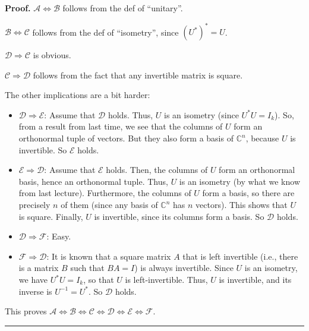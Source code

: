 \documentclass[numbers=enddot,12pt,final,onecolumn,notitlepage]{scrartcl}%
\numberwithin{exer}{subsection}
\theoremstyle{definition}
\newenvironment{proof}[1][Proof]{\noindent\textbf{#1.} }{\ \rule{0.5em}{0.5em}}
\begin{document}
\begin{proof}
$\mathcal{A}\Longleftrightarrow\mathcal{B}$ follows from the def of
\textquotedblleft unitary\textquotedblright.

$\mathcal{B}\Longleftrightarrow\mathcal{C}$ follows from the def of
\textquotedblleft isometry\textquotedblright, since $\left(  U^{\ast}\right)
^{\ast}=U$.

$\mathcal{D}\Longrightarrow\mathcal{C}$ is obvious.

$\mathcal{C}\Longrightarrow\mathcal{D}$ follows from the fact that any
invertible matrix is square.

The other implications are a bit harder:

\begin{itemize}
\item $\mathcal{D}\Longrightarrow\mathcal{E}$: Assume that $\mathcal{D}$
holds. Thus, $U$ is an isometry (since $U^{\ast}U=I_{k}$). So, from a result
from last time, we see that the columns of $U$ form an orthonormal tuple of
vectors. But they also form a basis of $\mathbb{C}^{n}$, because $U$ is
invertible. So $\mathcal{E}$ holds.

\item $\mathcal{E}\Longrightarrow\mathcal{D}$: Assume that $\mathcal{E}$
holds. Then, the columns of $U$ form an orthonormal basis, hence an
orthonormal tuple. Thus, $U$ is an isometry (by what we know from last
lecture). Furthermore, the columns of $U$ form a basis, so there are precisely
$n$ of them (since any basis of $\mathbb{C}^{n}$ has $n$ vectors). This shows
that $U$ is square. Finally, $U$ is invertible, since its columns form a
basis. So $\mathcal{D}$ holds.

\item $\mathcal{D}\Longrightarrow\mathcal{F}$: Easy.

\item $\mathcal{F}\Longrightarrow\mathcal{D}$: It is known that a square
matrix $A$ that is left invertible (i.e., there is a matrix $B$ such that
$BA=I$) is always invertible. Since $U$ is an isometry, we have $U^{\ast
}U=I_{k}$, so that $U$ is left-invertible. Thus, $U$ is invertible, and its
inverse is $U^{-1}=U^{\ast}$. So $\mathcal{D}$ holds.
\end{itemize}

This proves $\mathcal{A}\Longleftrightarrow\mathcal{B}\Longleftrightarrow
\mathcal{C}\Longleftrightarrow\mathcal{D}\Longleftrightarrow\mathcal{E}%
\Longleftrightarrow\mathcal{F}$.
\end{proof}
\end{document}
